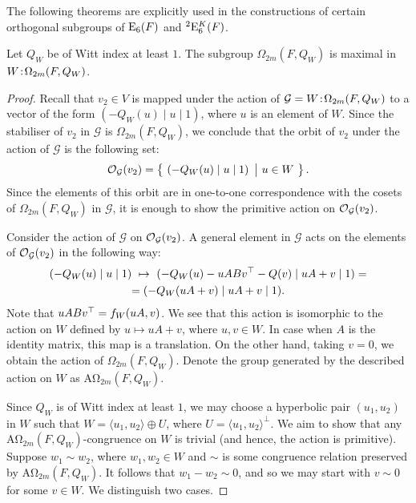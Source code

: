 The following theorems are explicitly used in the constructions of certain orthogonal subgroups
of $\mathord{\mathrm{E}}_6(F)$ and ${}^2\mathord{\mathrm{E}}_6^K(F)$. 

\begin{theorem}
	\label{theorem:A_omega_maximal}
	Let $Q_W$ be of Witt index at least $1$. The subgroup $\Omega_{2m}(F,Q_W)$ is maximal
	in $W\mathord{{\;\!{:}\;\!}}\Omega_{2m}(F,Q_W)$.
\end{theorem}

\begin{proof}
	Recall that $v_2 \in V$ is mapped under the action of 
    $\mathcal{G} = W\mathord{{\;\!{:}\;\!}}\Omega_{2m}(F,Q_W)$ to a vector of the
    form $(-Q_W(u) \mid u \mid 1)$, where $u$ is an element of $W$. 
    Since the stabiliser of $v_2$ in $\mathcal{G}$ is $\Omega_{2m}(F,Q_W)$, 
    we conclude that 
    the orbit of $v_2$ under the action of $\mathcal{G}$ is the following set:
    \begin{equation*}
	\operatorname{\mathcal{O}}_{\mathcal{G}}(v_2) = \left\{\  \left( -Q_W(u) \mid  u \mid 1
	 \right)\ \big|\ u \in W \ \right\}.
    \end{equation*}
    Since the elements of this orbit are in one-to-one correspondence with the
    cosets of $\Omega_{2m}(F,Q_W)$ in $\mathcal{G}$, 
    it is enough to show the primitive
    action on $\operatorname{\mathcal{O}}_{\mathcal{G}}(v_2)$. 
    
    Consider the action of $\mathcal{G}$ on 
    $\operatorname{\mathcal{O}}_{\mathcal{G}}(v_2)$. A general element in $\mathcal{G}$ 
    acts on the elements of $\operatorname{\mathcal{O}}_{\mathcal{G}}(v_2)$ in the following way:
    \begin{multline*}
	( -Q_W(u) \mid  u \mid 1 ) \ \mapsto \ 
	( -Q_W(u) - uABv^\T - Q(v) \mid
	    uA + v \mid 1) = \\
	    = (-Q_W(uA + v) \mid uA + v \mid 1).
    \end{multline*}
    Note that $uABv^\top = f_W( uA, v )$. 
    We see that this action is isomorphic to the action on $W$ defined by
	$u \mapsto uA + v$,
    where $u,v \in W$. In case when $A$ is the identity matrix, this map
    is a translation. On the other hand, taking $v = 0$, we obtain the
    action of $\Omega_{2m}(F,Q_W)$. 
    Denote the group generated by the described action on $W$ as
    $\mathrm{A\Omega}_{2m}(F,Q_W)$.
    
    Since $Q_W$ is of Witt index at least $1$, we may choose a hyperbolic pair 
    $(u_1,u_2)$ in $W$ such that $W = \langle u_1, u_2 \rangle \oplus U$, where 
    $U = \langle u_1, u_2 \rangle^{\perp}$. We aim to show that any 
    $\mathrm{A\Omega}_{2m}(F,Q_W)$-congruence on $W$ is trivial (and hence, the 
    action is primitive). Suppose $w_1 \sim w_2$, where $w_1,w_2 \in W$ and 
    $\sim$ is some congruence relation preserved by $\mathrm{A\Omega}_{2m}(F,Q_W)$.
    It follows that $w_1 - w_2 \sim 0$, and so we may start with $v \sim 0$ for some
    $v \in W$. We distinguish two cases.
    

\end{proof}
